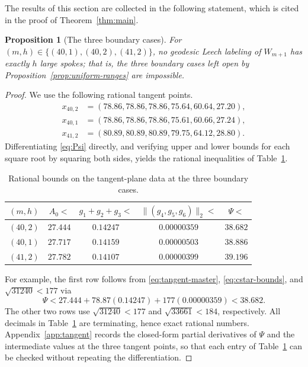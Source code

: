 \documentclass[11pt]{article}
\newtheorem{proposition}[theorem]{Proposition}
\theoremstyle{definition}
\theoremstyle{remark}
\numberwithin{equation}{section}
\begin{document}
The results of this section are collected in the following statement, which
is cited in the proof of Theorem~\ref{thm:main}.

\begin{proposition}[The three boundary cases]\label{lem:boundary}
For $(m,h)\in\{(40,1),(40,2),(41,2)\}$, no geodesic Leech labeling of $W_{m+1}$
has exactly $h$ large spokes; that is, the three boundary cases left open by
Proposition~\ref{prop:uniform-ranges} are impossible.
\end{proposition}

\begin{proof}
We use the following rational tangent points.
\[
\begin{aligned}
 x_{40,2}&=(78.86,78.86,78.86,75.64,60.64,27.20),\\
 x_{40,1}&=(78.86,78.86,78.86,75.61,60.66,27.24),\\
 x_{41,2}&=(80.89,80.89,80.89,79.75,64.12,28.80).
\end{aligned}
\]
Differentiating \eqref{eq:Psi} directly, and verifying upper and lower bounds for each square root by squaring both sides, yields the rational inequalities of Table~\ref{tab:tangent-bounds}.

\begin{table}[ht]
\centering
\caption{Rational bounds on the tangent-plane data at the three boundary
cases.}\label{tab:tangent-bounds}
\begin{tabular}{c@{\qquad}c@{\qquad}c@{\qquad}c@{\qquad}c}
\toprule
$(m,h)$ & $A_0<$ & $g_1+g_2+g_3<$ & $\|(g_4,g_5,g_6)\|_2<$ & $\Psi<$\\
\midrule
$(40,2)$ & $27.444$ & $0.14247$ & $0.00000359$ & $38.682$\\
$(40,1)$ & $27.717$ & $0.14159$ & $0.00000503$ & $38.886$\\
$(41,2)$ & $27.782$ & $0.14107$ & $0.00000399$ & $39.196$\\
\bottomrule
\end{tabular}
\end{table}

For example, the first row follows from \eqref{eq:tangent-master}, \eqref{eq:cstar-bounds}, and $\sqrt{31240}<177$ via
\[
  \Psi<27.444+78.87(0.14247)+177(0.00000359)<38.682.
\]
The other two rows use $\sqrt{31240}<177$ and $\sqrt{33661}<184$, respectively. All decimals in Table~\ref{tab:tangent-bounds} are terminating, hence exact rational numbers. Appendix~\ref{app:tangent} records the closed-form partial derivatives of $\Psi$ and the intermediate values at the three tangent points, so that each entry of Table~\ref{tab:tangent-bounds} can be checked without repeating the differentiation.


\end{proof}
\end{document}
